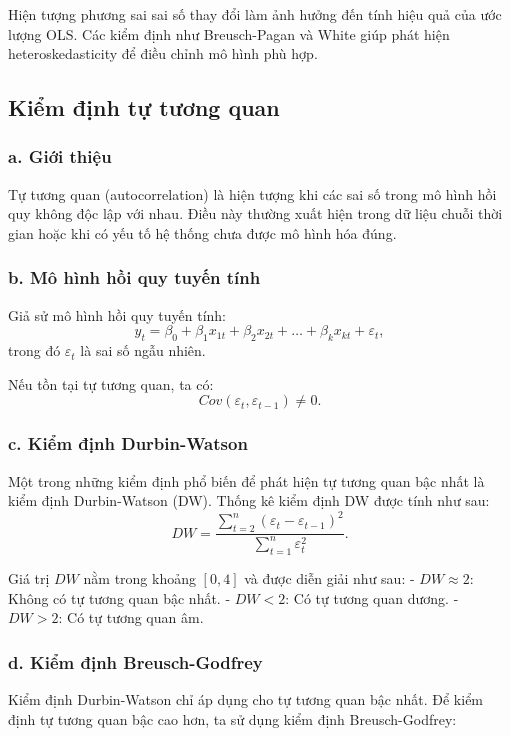 Hiện tượng phương sai sai số thay đổi làm ảnh hưởng đến tính hiệu quả của ước lượng OLS. Các kiểm định như Breusch-Pagan và White giúp phát hiện heteroskedasticity để điều chỉnh mô hình phù hợp.


\subsection{Kiểm định tự tương quan}
\subsubsection{a. Giới thiệu}
Tự tương quan (autocorrelation) là hiện tượng khi các sai số trong mô hình hồi quy không độc lập với nhau. Điều này thường xuất hiện trong dữ liệu chuỗi thời gian hoặc khi có yếu tố hệ thống chưa được mô hình hóa đúng.

\subsubsection{b. Mô hình hồi quy tuyến tính}
Giả sử mô hình hồi quy tuyến tính:
\begin{equation}
    y_t = \beta_0 + \beta_1 x_{1t} + \beta_2 x_{2t} + \dots + \beta_k x_{kt} + \varepsilon_t,
\end{equation}
trong đó $\varepsilon_t$ là sai số ngẫu nhiên.

Nếu tồn tại tự tương quan, ta có:
\begin{equation}
    Cov(\varepsilon_t, \varepsilon_{t-1}) \neq 0.
\end{equation}

\subsubsection{c. Kiểm định Durbin-Watson}
Một trong những kiểm định phổ biến để phát hiện tự tương quan bậc nhất là kiểm định Durbin-Watson (DW). Thống kê kiểm định DW được tính như sau:
\begin{equation}
    DW = \frac{\sum_{t=2}^{n} (\varepsilon_t - \varepsilon_{t-1})^2}{\sum_{t=1}^{n} \varepsilon_t^2}.
\end{equation}

Giá trị $DW$ nằm trong khoảng $[0,4]$ và được diễn giải như sau:
- $DW \approx 2$: Không có tự tương quan bậc nhất.
- $DW < 2$: Có tự tương quan dương.
- $DW > 2$: Có tự tương quan âm.

\subsubsection{d. Kiểm định Breusch-Godfrey}
Kiểm định Durbin-Watson chỉ áp dụng cho tự tương quan bậc nhất. Để kiểm định tự tương quan bậc cao hơn, ta sử dụng kiểm định Breusch-Godfrey:


